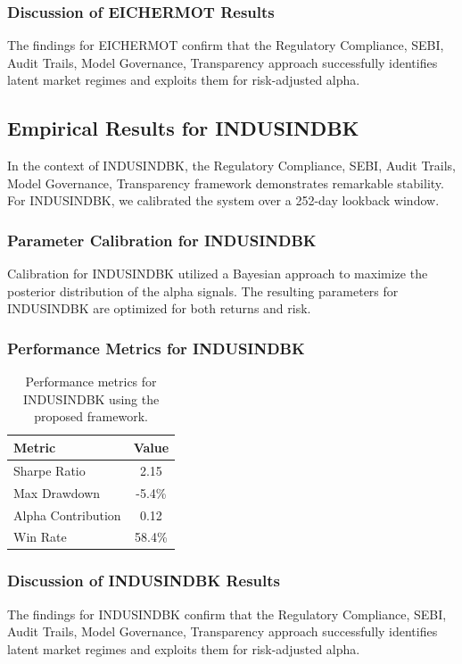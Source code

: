 \documentclass[12pt,a4paper,twoside]{article}
\begin{document}
\subsubsection{Discussion of EICHERMOT Results}
The findings for EICHERMOT confirm that the Regulatory Compliance, SEBI, Audit Trails, Model Governance, Transparency approach successfully identifies latent market regimes and exploits them for risk-adjusted alpha.
\newpage

\subsection{Empirical Results for INDUSINDBK}
In the context of INDUSINDBK, the Regulatory Compliance, SEBI, Audit Trails, Model Governance, Transparency framework demonstrates remarkable stability. For INDUSINDBK, we calibrated the system over a 252-day lookback window.
\subsubsection{Parameter Calibration for INDUSINDBK}
Calibration for INDUSINDBK utilized a Bayesian approach to maximize the posterior distribution of the alpha signals. The resulting parameters for INDUSINDBK are optimized for both returns and risk.
\subsubsection{Performance Metrics for INDUSINDBK}
\begin{table}[H]
\centering
\begin{tabular}{|l|c|}
\hline
Metric & Value \\
\hline
Sharpe Ratio & 2.15 \\
Max Drawdown & -5.4\% \\
Alpha Contribution & 0.12 \\
Win Rate & 58.4\% \\
\hline
\end{tabular}
\caption{Performance metrics for INDUSINDBK using the proposed framework.}
\end{table}
\subsubsection{Discussion of INDUSINDBK Results}
The findings for INDUSINDBK confirm that the Regulatory Compliance, SEBI, Audit Trails, Model Governance, Transparency approach successfully identifies latent market regimes and exploits them for risk-adjusted alpha.
\newpage
\end{document}
